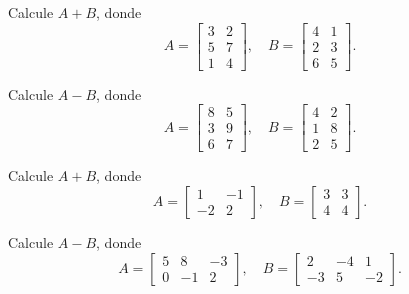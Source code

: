 \begin{ejercicio}
Calcule $A+B$, donde
\[
A=\begin{bmatrix} 3 & 2 \\ 5 & 7 \\ 1 & 4 \end{bmatrix}, \quad
B=\begin{bmatrix} 4 & 1 \\ 2 & 3 \\ 6 & 5 \end{bmatrix}.
\]
\end{ejercicio}
\muestraSolucion{
\[
A+B=\begin{bmatrix} 7 & 3 \\ 7 & 10 \\ 7 & 9 \end{bmatrix}.
\]
}

\begin{ejercicio}
Calcule $A-B$, donde
\[
A=\begin{bmatrix} 8 & 5 \\ 3 & 9 \\ 6 & 7 \end{bmatrix}, \quad
B=\begin{bmatrix} 4 & 2 \\ 1 & 8 \\ 2 & 5 \end{bmatrix}.
\]
\end{ejercicio}
\muestraSolucion{
\[
A-B=\begin{bmatrix} 4 & 3 \\ 2 & 1 \\ 4 & 2 \end{bmatrix}.
\]
}

\begin{ejercicio}
Calcule $A+B$, donde
\[
A=\begin{bmatrix} 1 & -1 \\ -2 & 2 \end{bmatrix}, \quad
B=\begin{bmatrix} 3 & 3 \\ 4 & 4 \end{bmatrix}.
\]
\end{ejercicio}
\muestraSolucion{
\[
A+B=\begin{bmatrix} 4 & 2 \\ 2 & 6 \end{bmatrix}.
\]
}

\begin{ejercicio}
Calcule $A-B$, donde
\[
A=\begin{bmatrix} 5 & 8 & -3 \\ 0 & -1 & 2 \end{bmatrix}, \quad
B=\begin{bmatrix} 2 & -4 & 1 \\ -3 & 5 & -2 \end{bmatrix}.
\]
\end{ejercicio}
\muestraSolucion{
\[
A-B=\begin{bmatrix} 3 & 12 & -4 \\ 3 & -6 & 4 \end{bmatrix}.
\]
}

